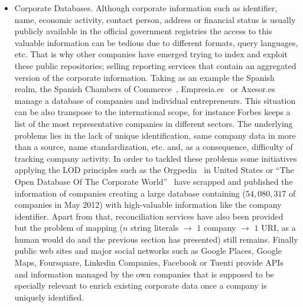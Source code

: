 \documentclass{llncs}
\begin{document}
\begin{itemize}
 
 \item Corporate Databases. Although corporate information such as identifier, name, economic activity, contact person, address or 
 financial status is usually publicly available in the official government registries the access to this valuable information can be 
 tedious due to different formats, query languages, etc. That is why other companies have emerged trying to index and exploit 
 these public repositories; selling reporting services that contain an aggregated version of the corporate information. Taking as 
 an example the Spanish realm, the Spanish Chambers of Commerce~\cite{CamaraSpain}, Empresia.es~\cite{Empresia} or Axesor.es~\cite{Axexor} manage a database of companies and individual  entrepreneurs. This situation can be also transpose to the international scope, for instance Forbes keeps a list of 
 the most representative companies in different sectors. The underlying problems lies in the lack of unique identification, same company data in more 
 than a source, name standardization, etc. and, as a consequence, difficulty of tracking company activity. In order to tackled these problems some 
 initiatives applying the LOD principles such as the Orgpedia~\cite{Orgpedia} in United States or 
 ``The Open Database Of The Corporate World''~\cite{Opencorporates} have scrapped and published the information 
 of companies creating a large database containing ($54,080,317$ of companies in May 2012) with high-valuable information like the company 
 identifier. Apart from that, reconciliation services have also been provided but the problem of mapping ($n$ string literals $\to$ $1$ company $\to$ $1$ URI, 
 as a human would do and the previous section has presented) still remains. Finally public web sites and major social networks such as Google 
 Places, Google Maps, Foursquare, Linkedin Companies, Facebook or Tuenti provide APIs and information managed by the own companies that is supposed 
 to be specially relevant to enrich existing corporate data once a company is uniquely identified.

 
\end{itemize}
\end{document}

